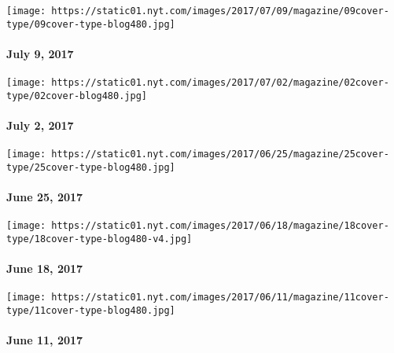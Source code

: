 \href{https://www.nytimes.com/issue/magazine/2017/07/07/magazine-index-20170709}{}

\texttt{[image: https://static01.nyt.com/images/2017/07/09/magazine/09cover-type/09cover-type-blog480.jpg]}

\hypertarget{july-9-2017}{%
\paragraph{July 9, 2017}\label{july-9-2017}}

\href{https://www.nytimes.com/issue/magazine/2017/06/30/magazine-index-20170702}{}

\texttt{[image: https://static01.nyt.com/images/2017/07/02/magazine/02cover-type/02cover-blog480.jpg]}

\hypertarget{july-2-2017}{%
\paragraph{July 2, 2017}\label{july-2-2017}}

\href{https://www.nytimes.com/issue/magazine/2017/06/23/magazine-index-20170625}{}

\texttt{[image: https://static01.nyt.com/images/2017/06/25/magazine/25cover-type/25cover-type-blog480.jpg]}

\hypertarget{june-25-2017}{%
\paragraph{June 25, 2017}\label{june-25-2017}}

\href{https://www.nytimes.com/issue/magazine/2017/06/16/magazine-index-20170618}{}

\texttt{[image: https://static01.nyt.com/images/2017/06/18/magazine/18cover-type/18cover-type-blog480-v4.jpg]}

\hypertarget{june-18-2017}{%
\paragraph{June 18, 2017}\label{june-18-2017}}

\href{https://www.nytimes.com/issue/magazine/2017/06/09/the-61117-issue-20170611}{}

\texttt{[image: https://static01.nyt.com/images/2017/06/11/magazine/11cover-type/11cover-type-blog480.jpg]}

\hypertarget{june-11-2017}{%
\paragraph{June 11, 2017}\label{june-11-2017}}

